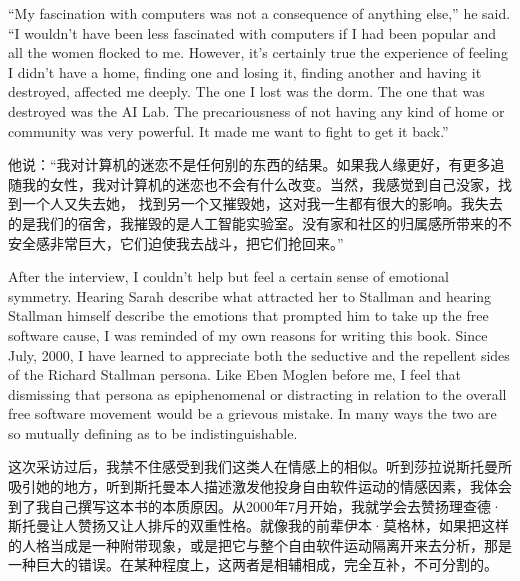 \ifdefined\eng
``My fascination with computers was not a consequence of anything else,'' he said. ``I wouldn't have been less fascinated with computers if I had been popular and all the women flocked to me. However, it's certainly true the experience of feeling I didn't have a home, finding one and losing it, finding another and having it destroyed, affected me deeply. The one I lost was the dorm. The one that was destroyed was the AI Lab. The precariousness of not having any kind of home or community was very powerful. It made me want to fight to get it back.''
\fi

\ifdefined\chs
他说：“我对计算机的迷恋不是任何别的东西的结果。如果我人缘更好，有更多追随我的女性，我对计算机的迷恋也不会有什么改变。当然，我感觉到自己没家，找到一个人又失去她， 找到另一个又摧毁她，这对我一生都有很大的影响。我失去的是我们的宿舍，我摧毁的是人工智能实验室。没有家和社区的归属感所带来的不安全感非常巨大，它们迫使我去战斗，把它们抢回来。”
\fi

\ifdefined\eng
After the interview, I couldn't help but feel a certain sense of emotional symmetry. Hearing Sarah describe what attracted her to Stallman and hearing Stallman himself describe the emotions that prompted him to take up the free software cause, I was reminded of my own reasons for writing this book. Since July, 2000, I have learned to appreciate both the seductive and the repellent sides of the Richard Stallman persona. Like Eben Moglen before me, I feel that dismissing that persona as epiphenomenal or distracting in relation to the overall free software movement would be a grievous mistake. In many ways the two are so mutually defining as to be indistinguishable.
\fi

\ifdefined\chs
这次采访过后，我禁不住感受到我们这类人在情感上的相似。听到莎拉说斯托曼所吸引她的地方，听到斯托曼本人描述激发他投身自由软件运动的情感因素，我体会到了我自己撰写这本书的本质原因。从2000年7月开始，我就学会去赞扬理查德·斯托曼让人赞扬又让人排斥的双重性格。就像我的前辈伊本·莫格林，如果把这样的人格当成是一种附带现象，或是把它与整个自由软件运动隔离开来去分析，那是一种巨大的错误。在某种程度上，这两者是相辅相成，完全互补，不可分割的。
\fi



